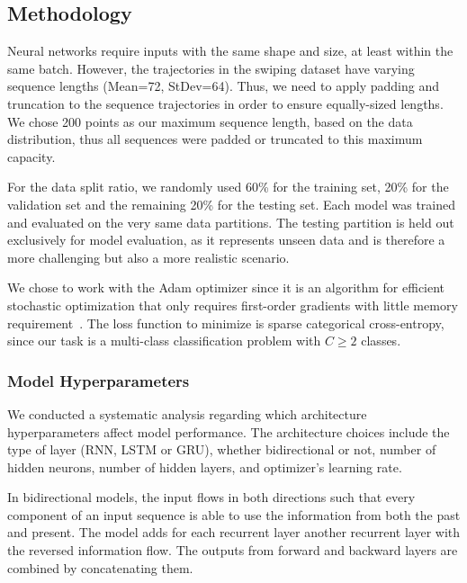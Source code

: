 \documentclass[sn-mathphys, pdflatex]{sn-jnl}
\newcommand{\rev}[1]{#1}
\begin{document}
\subsection{Methodology}

Neural networks require inputs with the same shape and size, at least within the same batch.
However, the trajectories in the swiping dataset have varying sequence lengths \rev{(Mean=72, StDev=64)}.
Thus, we need to apply padding and truncation to the sequence trajectories in order to ensure equally-sized lengths.
We chose 200 points as our maximum sequence length, based on the data distribution,
thus all sequences were padded or truncated to this maximum capacity.

For the data split ratio, we \rev{randomly} used 60\% for the training set, 20\% for the validation set
and the remaining 20\% for the testing set.
\rev{Each model was trained and evaluated on the very same data partitions.
The testing partition is held out exclusively for model evaluation, as it represents unseen data
and is therefore a more challenging but also a more realistic scenario.
}
We chose to work with the Adam optimizer since it is an algorithm for efficient stochastic optimization
that only requires first-order gradients with little memory requirement~\cite{Adam}.
The loss function to minimize is sparse categorical cross-entropy,
since our task is a multi-class classification problem with $C \geq 2$ classes.

\subsubsection{Model Hyperparameters}

We conducted a systematic analysis regarding which architecture hyperparameters affect model performance.
The architecture choices include the type of layer (RNN, LSTM or GRU),
whether bidirectional or not, number of hidden neurons, number of hidden layers, and optimizer's learning rate.

In bidirectional models, the input flows in both directions
such that every component of an input sequence is able to use the information from both the past and present.
The model adds for each recurrent layer another recurrent layer with the reversed information flow.
The outputs from forward and backward layers are combined by concatenating them.
\end{document}
